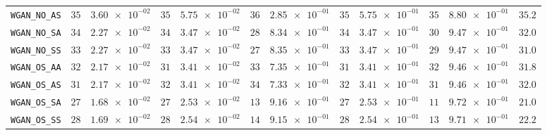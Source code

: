 \begin{xltabular}{\textwidth}{l||cC|cC|cC|cC|cC||c}
	\texttt{WGAN\_NO\_AS} & $ 35$ & $ \num{3.60e-02}$ & $ 35$ & $ \num{5.75e-02}$ & $ 36$ & $ \num{2.85e-01}$ & $ 35$ & $ \num{5.75e-01}$ & $ 35$ & $ \num{8.80e-01}$ & $ 35.2$  \\
	\texttt{WGAN\_NO\_SA} & $ 34$ & $ \num{2.27e-02}$ & $ 34$ & $ \num{3.47e-02}$ & $ 28$ & $ \num{8.34e-01}$ & $ 34$ & $ \num{3.47e-01}$ & $ 30$ & $ \num{9.47e-01}$ & $ 32.0$  \\
	\texttt{WGAN\_NO\_SS} & $ 33$ & $ \num{2.27e-02}$ & $ 33$ & $ \num{3.47e-02}$ & $ 27$ & $ \num{8.35e-01}$ & $ 33$ & $ \num{3.47e-01}$ & $ 29$ & $ \num{9.47e-01}$ & $ 31.0$  \\
	\texttt{WGAN\_OS\_AA} & $ 32$ & $ \num{2.17e-02}$ & $ 31$ & $ \num{3.41e-02}$ & $ 33$ & $ \num{7.35e-01}$ & $ 31$ & $ \num{3.41e-01}$ & $ 32$ & $ \num{9.46e-01}$ & $ 31.8$  \\
	\texttt{WGAN\_OS\_AS} & $ 31$ & $ \num{2.17e-02}$ & $ 32$ & $ \num{3.41e-02}$ & $ 34$ & $ \num{7.33e-01}$ & $ 32$ & $ \num{3.41e-01}$ & $ 31$ & $ \num{9.46e-01}$ & $ 32.0$  \\
	\texttt{WGAN\_OS\_SA} & $ 27$ & $ \num{1.68e-02}$ & $ 27$ & $ \num{2.53e-02}$ & $ 13$ & $ \num{9.16e-01}$ & $ 27$ & $ \num{2.53e-01}$ & $ 11$ & $ \num{9.72e-01}$ & $ 21.0$  \\
	\texttt{WGAN\_OS\_SS} & $ 28$ & $ \num{1.69e-02}$ & $ 28$ & $ \num{2.54e-02}$ & $ 14$ & $ \num{9.15e-01}$ & $ 28$ & $ \num{2.54e-01}$ & $ 13$ & $ \num{9.71e-01}$ & $ 22.2$  \\

\end{xltabular}
